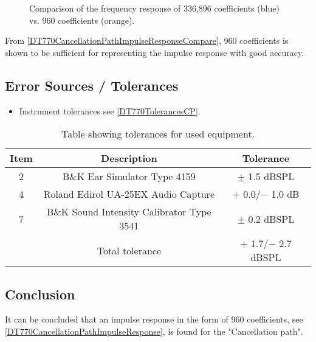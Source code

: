 \begin{figure}[H]
	\centering
	
	\caption{Comparison of the frequency response of 336,896 coefficients (blue) vs. 960 coefficients (orange).}
	\label{DT770CancellationPathImpulseResponseCompare}
\end{figure}
\pagebreak
From \autoref{DT770CancellationPathImpulseResponseCompare}, 960 coefficients is shown to be sufficient for representing the impulse response with good accuracy. 

\subsection{Error Sources / Tolerances}
\begin{itemize}
	\item Instrument tolerances see \autoref{DT770TolerancesCP}.
\end{itemize}

\begin{table}[H]
	\centering
	\begin{tabular}{ c c c } \toprule
		{Item}	& 		{Description} 	& {Tolerance}	 \\ \bottomrule 
		2	&	B\&K Ear Simulator Type 4159				& $\pm$ 1.5 dBSPL \cite{BK4159Tol} 	\\
		4	&	Roland Edirol UA-25EX Audio Capture			& $+$ 0.0/$-$ 1.0 dB \cite{UA25EXTol} \\
		7	&	B\&K Sound Intensity Calibrator Type 3541	& $\pm$ 0.2 dBSPL \cite{BK3541Tol}	\\ \bottomrule
			&	Total tolerance								& $+$ 1.7/$-$ 2.7 dBSPL	\\ \bottomrule	
	\end{tabular}
	\caption{Table showing tolerances for used equipment.}
	\label{DT770TolerancesCP}
\end{table}

\subsection{Conclusion}
It can be concluded that an impulse response in the form of 960 coefficients, see \autoref{DT770CancellationPathImpulseResponse}, is found for the "Cancellation path".
